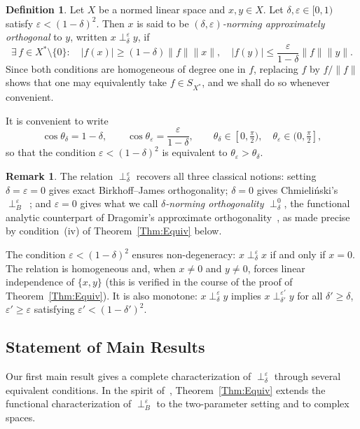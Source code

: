 \documentclass[11pt, reqno]{amsart}
\theoremstyle{definition}
\newtheorem{definition}[theorem]{Definition}
\newtheorem{remark}[theorem]{Remark}
\newcommand{\nperp}{\perp_{\delta}^\varepsilon}
\begin{document}
\begin{definition}\label{1st Defn}
Let $X$ be a normed linear space and $x, y \in X$. Let $\delta, \varepsilon \in [0,1)$ 
satisfy $\varepsilon < (1-\delta)^2$. Then $x$ is said to be 
\emph{$(\delta,\varepsilon)$-norming approximately orthogonal} to $y$, written 
$x \nperp y$, if
\[
\exists\, f \in X^* \setminus\{0\} : \quad |f(x)| \geq (1-\delta)\|f\|\|x\|, 
\quad |f(y)| \leq \frac{\varepsilon}{1-\delta}\|f\|\|y\|.
\]
 Since both conditions are homogeneous of degree one in $f$, replacing $f$ by 
$f/\|f\|$ shows that one may equivalently take $f\in S_{X^*}$, and we shall do so 
whenever convenient.
\end{definition}


\noindent It is convenient to write
\[
\cos\theta_\delta = 1-\delta, \qquad \cos\theta_\varepsilon = \frac{\varepsilon}{1-\delta},
\qquad \theta_\delta\in[0,\tfrac{\pi}{2}),\quad \theta_\varepsilon\in(0,\tfrac{\pi}{2}],
\]
so that the condition $\varepsilon<(1-\delta)^2$ is equivalent to $\theta_\varepsilon>\theta_\delta$.

\begin{remark}
The relation $\nperp$ recovers all three classical notions: setting 
$\delta = \varepsilon = 0$ gives exact Birkhoff--James orthogonality; 
$\delta = 0$ gives Chmieli\'nski's $\perp_B^\varepsilon$~\cite{Chm1, ChmStWoj}; 
and $\varepsilon = 0$ gives what we call \emph{$\delta$-norming orthogonality} 
$\perp^0_\delta$, the functional analytic counterpart of Dragomir's approximate 
orthogonality~\cite{Drag}, as made precise by condition~(iv) of 
Theorem~\ref{Thm:Equiv} below. 
\end{remark}

\noindent The condition $\varepsilon < (1-\delta)^2$ ensures non-degeneracy: 
$x \nperp x$ if and only if $x = 0$. The relation is homogeneous and, when 
$x \neq 0$  and $y \neq 0$, forces linear independence of $\{x, y\}$ 
 (this is verified in the course of the proof of 
Theorem~\ref{Thm:Equiv}). It is also monotone: 
$x \nperp y$ implies $x \perp_{\delta'}^{\varepsilon'} y$ for all
$\delta' \geq \delta$, $\varepsilon' \geq \varepsilon$ satisfying
$\varepsilon' < (1-\delta')^2$. 



\subsection{Statement of Main Results}

\noindent Our first main result gives a complete characterization of $\nperp$ 
through several equivalent conditions. In the spirit of~\cite{ChmStWoj}, 
Theorem~\ref{Thm:Equiv} extends the functional characterization of 
$\perp_B^\varepsilon$ to the two-parameter setting and to complex spaces.
\end{document}
